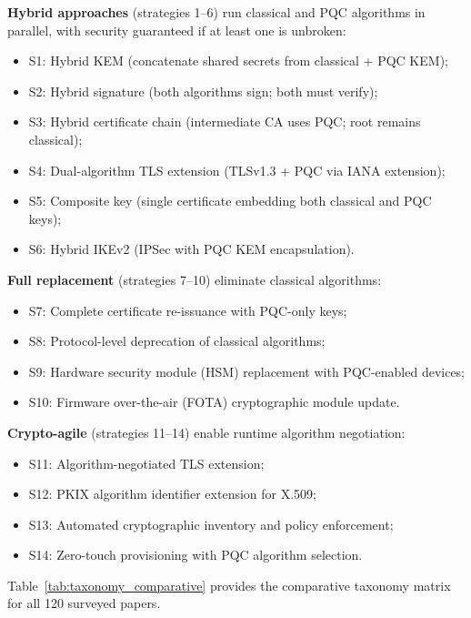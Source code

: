 \documentclass[journal]{IEEEtran}
\begin{document}
\textbf{Hybrid approaches} (strategies 1--6) run classical and PQC algorithms
in parallel, with security guaranteed if at least one is unbroken:
\begin{itemize}
  \item S1: Hybrid KEM (concatenate shared secrets from classical + PQC KEM);
  \item S2: Hybrid signature (both algorithms sign; both must verify);
  \item S3: Hybrid certificate chain (intermediate CA uses PQC; root remains classical);
  \item S4: Dual-algorithm TLS extension (TLSv1.3 + PQC via IANA extension);
  \item S5: Composite key (single certificate embedding both classical and PQC keys);
  \item S6: Hybrid IKEv2 (IPSec with PQC KEM encapsulation).
\end{itemize}

\textbf{Full replacement} (strategies 7--10) eliminate classical algorithms:
\begin{itemize}
  \item S7: Complete certificate re-issuance with PQC-only keys;
  \item S8: Protocol-level deprecation of classical algorithms;
  \item S9: Hardware security module (HSM) replacement with PQC-enabled devices;
  \item S10: Firmware over-the-air (FOTA) cryptographic module update.
\end{itemize}

\textbf{Crypto-agile} (strategies 11--14) enable runtime algorithm negotiation:
\begin{itemize}
  \item S11: Algorithm-negotiated TLS extension;
  \item S12: PKIX algorithm identifier extension for X.509;
  \item S13: Automated cryptographic inventory and policy enforcement;
  \item S14: Zero-touch provisioning with PQC algorithm selection.
\end{itemize}

Table~\ref{tab:taxonomy_comparative} provides the comparative taxonomy matrix
for all 120 surveyed papers.
\end{document}
